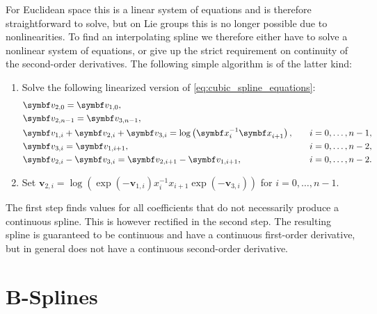 For Euclidean space this is a linear system of equations and is therefore straightforward to solve, but on Lie groups this is no longer possible due to nonlinearities. To find an interpolating spline we therefore either have to solve a nonlinear system of equations, or give up the strict requirement on continuity of the second-order derivatives. The following simple algorithm is of the latter kind:
\begin{enumerate}
  \item Solve the following linearized version of \eqref{eq:cubic_spline_equations}:
        \begin{equation}
          \label{eq:cubic_spline_equations_linearized}
          \begin{aligned}
             & \symbf v_{2, 0} = \symbf v_{1, 0},                                                                               \\
             & \symbf v_{2, n-1} = \symbf v_{3, n-1},                                                                           \\
             & \symbf v_{1, i} + \symbf v_{2, i} + \symbf v_{3, i} = \log\left(\x_{i}^{-1} \x_{i+1} \right), & \quad i = 0, \ldots, n-1, \\
             & \symbf v_{3, i} = \symbf v_{1, i+1},                                                 & \quad i = 0, \ldots, n-2, \\
             & \symbf v_{2, i} - \symbf v_{3, i} = \symbf v_{2, i+1} - \symbf v_{1, i+1},           & \quad i = 0, \ldots, n-2. \\
          \end{aligned}
        \end{equation}
  \item Set $\symbf v_{2, i} = \log \left( \exp(-\symbf v_{1, i}) x_{i}^{-1} x_{i+1} \exp(-\symbf v_{3, i}) \right )$ for $i = 0, \ldots, n-1$.
\end{enumerate}
The first step finds values for all coefficients that do not necessarily produce a continuous spline. This is however rectified in the second step. The resulting spline is guaranteed to be continuous and have a continuous first-order derivative, but in general does not have a continuous second-order derivative.

\section{B-Splines}

